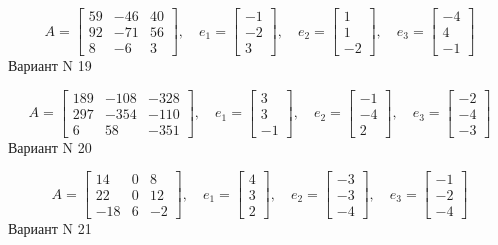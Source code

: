 \documentclass[11pt]{report}
\begin{document}
$$A = \left[\begin{matrix}59 & -46 & 40\\92 & -71 & 56\\8 & -6 & 3\end{matrix}\right],\quad e_1 = \left[\begin{matrix}-1\\-2\\3\end{matrix}\right],\quad e_2 = \left[\begin{matrix}1\\1\\-2\end{matrix}\right],\quad e_3 = \left[\begin{matrix}-4\\4\\-1\end{matrix}\right]$$Вариант N 19

$$A = \left[\begin{matrix}189 & -108 & -328\\297 & -354 & -110\\6 & 58 & -351\end{matrix}\right],\quad e_1 = \left[\begin{matrix}3\\3\\-1\end{matrix}\right],\quad e_2 = \left[\begin{matrix}-1\\-4\\2\end{matrix}\right],\quad e_3 = \left[\begin{matrix}-2\\-4\\-3\end{matrix}\right]$$Вариант N 20

$$A = \left[\begin{matrix}14 & 0 & 8\\22 & 0 & 12\\-18 & 6 & -2\end{matrix}\right],\quad e_1 = \left[\begin{matrix}4\\3\\2\end{matrix}\right],\quad e_2 = \left[\begin{matrix}-3\\-3\\-4\end{matrix}\right],\quad e_3 = \left[\begin{matrix}-1\\-2\\-4\end{matrix}\right]$$Вариант N 21
\end{document}
